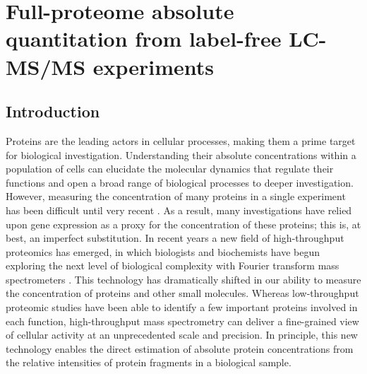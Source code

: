 

\chapter{Full-proteome absolute quantitation from label-free LC-MS/MS experiments}
\label{proteomics:ch:proteomics}

\section{Introduction}
\label{proteomics:sec:intro}

Proteins are the leading actors in cellular processes, making them a prime target for biological investigation.
Understanding their absolute concentrations within a population of cells can elucidate the molecular dynamics that regulate their functions \citep{Ishihama:2005ir} and open a broad range of biological processes to deeper investigation.
However, measuring the concentration of many proteins in a single experiment has been difficult until very recent \citep{Ghaemmagham:2003tu}. 
As a result, many investigations have relied upon gene expression as a proxy for the concentration of these proteins; this is, at best, an imperfect substitution.
In recent years a new field of high-throughput proteomics has emerged, in which biologists and biochemists have begun exploring the next level of biological complexity with Fourier transform mass spectrometers  \citep{Scigelova:2006p10560,Scigelova:2011dt}.
This technology has dramatically shifted in our ability to measure the concentration of proteins and other small molecules.
Whereas low-throughput proteomic studies have been able to identify a few important proteins involved in each function, high-throughput mass spectrometry can deliver a fine-grained view of cellular activity at an unprecedented scale and precision.
In principle, this new technology enables the direct estimation of absolute protein concentrations from the relative intensities of protein fragments in a biological sample.

